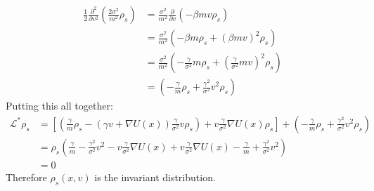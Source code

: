 \documentclass[12pt]{article}
\theoremstyle{plain}
\theoremstyle{definition}
\theoremstyle{remark}
\begin{document}
\begin{enumerate}
\begin{enumerate}
        \begin{align*}
          \frac{1}{2}\frac{\partial^2}{\partial v^2}
          \left(\frac{2\sigma^2}{m^2}\rho_s\right)
          &=
          \frac{\sigma^2}{m^2}
          \frac{\partial}{\partial v}
          \left( -\beta mv\rho_s \right)\\
          &=
          \frac{\sigma^2}{m^2}
          \left( -\beta m\rho_s + (\beta mv)^2 \rho_s\right)\\
          &=
          \frac{\sigma^2}{m^2}
          \left( -\frac{\gamma}{\sigma^2} m\rho_s
            + \left(\frac{\gamma}{\sigma^2} mv\right)^2 \rho_s\right)\\
          &=
          \left( -\frac{\gamma}{m} \rho_s
            + \frac{\gamma^2}{\sigma^2} v^2 \rho_s\right)
        \end{align*}
        Putting this all together:
        \begin{align*}
          \mathscr{L}^*\rho_s
          &=
          \left[
            \left(
            \frac{\gamma}{m}
            \rho_s
            -(\gamma v + \nabla U(x))
            \frac{\gamma}{\sigma^2} v\rho_s
            \right)
            + v\frac{\gamma}{\sigma^2} \nabla U(x)\rho_s
          \right]
          +
          \left( -\frac{\gamma}{m} \rho_s
            + \frac{\gamma^2}{\sigma^2} v^2 \rho_s\right)\\
          &=
          \rho_s\left(
            \frac{\gamma}{m}
            -\frac{\gamma^2}{\sigma^2} v^2
            - v\frac{\gamma}{\sigma^2} \nabla U(x)
            + v\frac{\gamma}{\sigma^2} \nabla U(x)
          -\frac{\gamma}{m}
            + \frac{\gamma^2}{\sigma^2} v^2 \right)\\
            &= 0
        \end{align*}
        Therefore $\rho_s(x,v)$ is the invariant distribution.


\end{enumerate}
\end{enumerate}
\end{document}
